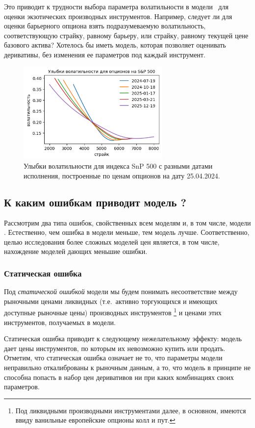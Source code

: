 Это приводит к трудности выбора параметра волатильности в модели \bs\ для оценки экзотических производных инструментов.
Например, следует ли для оценки барьерного опциона взять подразумеваемую волатильность, соответствующую страйку, равному барьеру, или страйку, равному текущей цене базового актива?
Хотелось бы иметь модель, которая позволяет оценивать деривативы, без изменения ее параметров под каждый инструмент.

\begin{figure}[t]
\includegraphics[height=5cm]{pic/snp-smiles.png}
\centering
\caption{Улыбки волатильности для индекса SnP 500 с разными датами исполнения, построенные по ценам опционов на дату  25.04.2024.}
\label{intro:f:smiles}
\end{figure}


\subsection{К каким ошибкам приводит модель \bs?}

Рассмотрим два типа ошибок, свойственных всем моделям и, в том числе, модели \bs.
Естественно, чем ошибка в модели меньше, тем модель лучше.
Соответственно, целью исследования более сложных моделей цен является, в том числе, нахождение моделей дающих меньшие ошибки.

\subsubsection{Статическая ошибка}
Под \emph{статической ошибкой} модели мы будем понимать несоответствие между рыночными ценами ликвидных (т.е.\ активно торгующихся и имеющих доступные рыночные цены) производных инструментов%
\footnote{Под ликвидными производными инструментами далее, в основном, имеются ввиду ванильные европейские опционы колл и пут.}
и ценами этих инструментов, получаемых в модели.

Статическая ошибка приводит к следующему нежелательному эффекту: модель дает цены инструментов, по которым их невозможно купить или продать.
Отметим, что статическая ошибка означает не то, что параметры модели неправильно откалиброваны к рыночным данным, а то, что модель в принципе не способна попасть в набор цен деривативов ни при каких комбинациях своих параметров.

